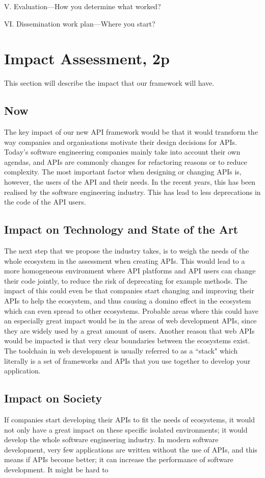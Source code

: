 \documentclass{article}
\begin{document}
V.
Evaluation—How you determine what worked?

VI.
Dissemination work plan—Where you start?
\newpage

\section{Impact Assessment, 2p}
This section will describe the impact that our framework will have. 

\subsection{Now}
The key impact of our new API framework would be that it would transform the way companies and organisations motivate their design decisions for APIs. Today's software engineering companies mainly take into account their own agendas, and APIs are commonly changes for refactoring reasons or to reduce complexity. The most important factor when designing or changing APIs is, however, the users of the API and their needs. In the recent years, this has been realised by the software engineering industry. This has lead to less deprecations in the code of the API users. 

\subsection{Impact on Technology and State of the Art}
The next step that we propose the industry takes, is to weigh the needs of the whole ecosystem in the assessment when creating APIs. This would lead to a more homogeneous environment where API platforms and API users can change their code jointly, to reduce the risk of deprecating for example methods. The impact of this could even be that companies start changing and improving their APIs to help the ecosystem, and thus causing a domino effect in the ecosystem which can even spread to other ecosystems. Probable areas where this could have an especially great impact would be in the areas of web development APIs, since they are widely used by a great amount of users. Another reason that web APIs would be impacted is that very clear boundaries between the ecosystems exist. The toolchain in web development is usually referred to as a ``stack" which literally is a set of frameworks and APIs that you use together to develop your application. 

\subsection{Impact on Society}
If companies start developing their APIs to fit the needs of ecosystems, it would not only have a great impact on these specific isolated environments; it would develop the whole software engineering industry. In modern software development, very few applications are written without the use of APIs, and this means if APIs become better; it can increase the performance of software development. It might be hard to 
\end{document}
